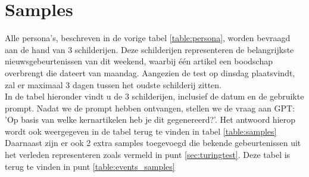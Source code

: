 \section{Samples}
Alle persona's, beschreven in de vorige tabel \ref{table:persona}, worden bevraagd aan de hand van 3 schilderijen. Deze schilderijen representeren de belangrijkste nieuwsgebeurtenissen van dit weekend, waarbij één artikel een boodschap overbrengt die dateert van maandag. Aangezien de test op dinsdag plaatsvindt, zal er maximaal 3 dagen tussen het oudste schilderij zitten. \\

In de tabel hieronder vindt u de 3 schilderijen, inclusief de datum en de gebruikte prompt. Nadat we de prompt hebben ontvangen, stellen we de vraag aan GPT: 'Op basis van welke kernartikelen heb je dit gegenereerd?'. Het antwoord hierop wordt ook weergegeven in de tabel terug te vinden in tabel \ref{table:samples}
Daarnaast zijn er ook 2 extra samples toegevoegd die bekende gebeurtenissen uit het verleden representeren zoals vermeld in punt \ref{sec:turingtest}. Deze tabel is terug te vinden in punt \ref{table:events_samples}


